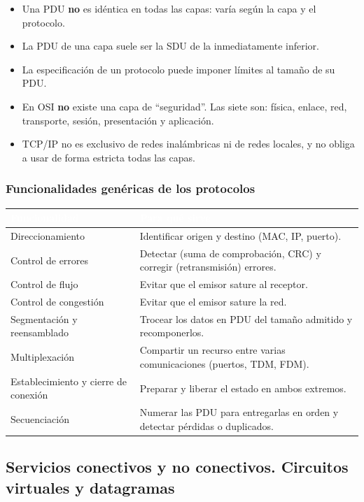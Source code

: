 \documentclass[11pt,a4paper]{article}
\newcommand{\hd}[1]{\cellcolor{uahblue}\textcolor{white}{\textbf{#1}}}
\begin{document}
\begin{ojo}
\begin{itemize}
  \item Una PDU \textbf{no} es idéntica en todas las capas: varía según la capa y el protocolo.
  \item La PDU de una capa suele ser la SDU de la inmediatamente inferior.
  \item La especificación de un protocolo puede imponer límites al tamaño de su PDU.
  \item En OSI \textbf{no} existe una capa de ``seguridad''. Las siete son: física, enlace, red, transporte, sesión, presentación y aplicación.
  \item TCP/IP no es exclusivo de redes inalámbricas ni de redes locales, y no obliga a usar de forma estricta todas las capas.
\end{itemize}
\end{ojo}

\subsubsection{Funcionalidades genéricas de los protocolos}

\begin{tabularx}{\textwidth}{@{}L{4.2cm}X@{}}
\toprule
\hd{Funcionalidad} & \hd{Para qué sirve} \\
\midrule
Direccionamiento & Identificar origen y destino (MAC, IP, puerto). \\
Control de errores & Detectar (suma de comprobación, CRC) y corregir (retransmisión) errores. \\
Control de flujo & Evitar que el emisor sature al receptor. \\
Control de congestión & Evitar que el emisor sature la red. \\
Segmentación y reensamblado & Trocear los datos en PDU del tamaño admitido y recomponerlos. \\
Multiplexación & Compartir un recurso entre varias comunicaciones (puertos, TDM, FDM). \\
Establecimiento y cierre de conexión & Preparar y liberar el estado en ambos extremos. \\
Secuenciación & Numerar las PDU para entregarlas en orden y detectar pérdidas o duplicados. \\
\bottomrule
\end{tabularx}

\subsection{Servicios conectivos y no conectivos. Circuitos virtuales y datagramas}
\end{document}
